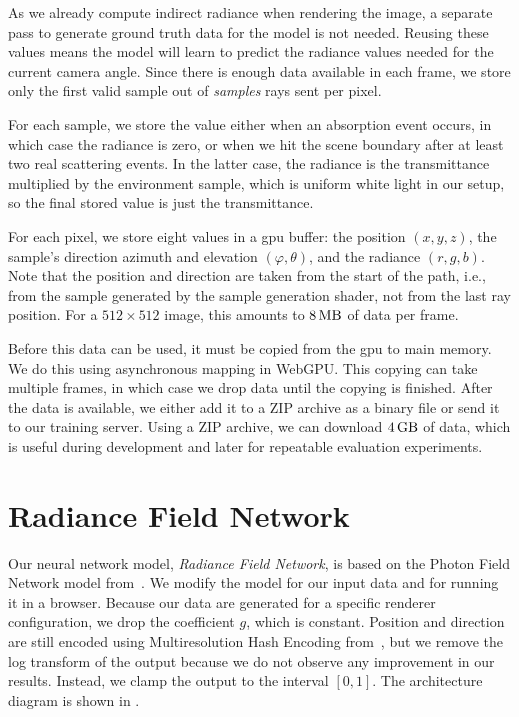 As we already compute indirect radiance when rendering the image, a separate
pass to generate ground truth data for the model is not needed. Reusing these
values means the model will learn to predict the radiance values needed for the
current camera angle. Since there is enough data available in each frame, we
store only the first valid sample out of \emph{samples} rays sent per pixel.

For each sample, we store the value either when an absorption event occurs, in
which case the radiance is zero, or when we hit the scene boundary after at
least two real scattering events. In the latter case, the radiance is the 
transmittance multiplied by the environment sample, which is uniform white light
in our setup, so the final stored value is just the transmittance.

For each pixel, we store eight values in a \ac{gpu} buffer: the position
$(x, y, z)$, the sample’s direction azimuth and elevation $(\varphi, \theta)$,
and the radiance $(r, g, b)$. Note that the position and direction are taken
from the start of the path, i.e., from the sample generated by the sample
generation shader, not from the last ray position. For a $512 \times 512$ image,
this amounts to $\qty{8}{\mega\byte}$ of data per frame.

Before this data can be used, it must be copied from the \ac{gpu} to main memory.
We do this using asynchronous mapping in WebGPU. This copying can take multiple
frames, in which case we drop data until the copying is finished. After the data
is available, we either add it to a ZIP archive as a binary file or send it to our
training server. Using a ZIP archive, we can download $\qty{4}{\giga\byte}$ of
data, which is useful during development and later for repeatable evaluation
experiments.

\section{Radiance Field Network}

Our neural network model, \emph{Radiance Field Network}, is based on the
Photon Field Network model from~\cite{bauer_photon_2024}. We modify the model
for our input data and for running it in a browser. Because our data are
generated for a specific renderer configuration, we drop the coefficient $g$,
which is constant. Position and direction are still encoded using
Multiresolution Hash Encoding from~\cite{muller_instant_2022}, but we remove the
log transform of the output because we do not observe any improvement in our
results. Instead, we clamp the output to the interval $[0, 1]$. The
architecture diagram is shown in .

